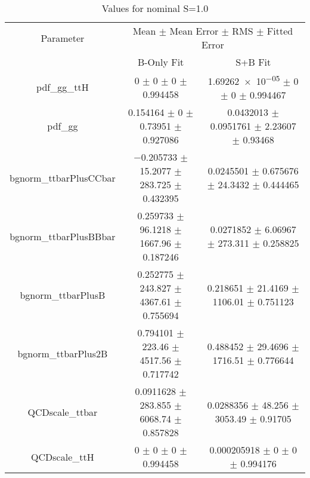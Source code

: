 \begin{table}
\centering
\caption{Values for nominal S=1.0}
\begin{tabular}{ccc}
\toprule
Parameter & \multicolumn{2}{c}{Mean $\pm$ Mean Error $\pm$ RMS $\pm$ Fitted Error}\\
 & B-Only Fit & S+B Fit\\
\midrule
pdf\_gg\_ttH & \num{0} $\pm$ \num{0} $\pm$ \num{0} $\pm$ \num{0.994458} & \num{1.69262e-05} $\pm$ \num{0} $\pm$ \num{0} $\pm$ \num{0.994467}\\
pdf\_gg & \num{0.154164} $\pm$ \num{0} $\pm$ \num{0.73951} $\pm$ \num{0.927086} & \num{0.0432013} $\pm$ \num{0.0951761} $\pm$ \num{2.23607} $\pm$ \num{0.93468}\\
bgnorm\_ttbarPlusCCbar & \num{-0.205733} $\pm$ \num{15.2077} $\pm$ \num{283.725} $\pm$ \num{0.432395} & \num{0.0245501} $\pm$ \num{0.675676} $\pm$ \num{24.3432} $\pm$ \num{0.444465}\\
bgnorm\_ttbarPlusBBbar & \num{0.259733} $\pm$ \num{96.1218} $\pm$ \num{1667.96} $\pm$ \num{0.187246} & \num{0.0271852} $\pm$ \num{6.06967} $\pm$ \num{273.311} $\pm$ \num{0.258825}\\
bgnorm\_ttbarPlusB & \num{0.252775} $\pm$ \num{243.827} $\pm$ \num{4367.61} $\pm$ \num{0.755694} & \num{0.218651} $\pm$ \num{21.4169} $\pm$ \num{1106.01} $\pm$ \num{0.751123}\\
bgnorm\_ttbarPlus2B & \num{0.794101} $\pm$ \num{223.46} $\pm$ \num{4517.56} $\pm$ \num{0.717742} & \num{0.488452} $\pm$ \num{29.4696} $\pm$ \num{1716.51} $\pm$ \num{0.776644}\\
QCDscale\_ttbar & \num{0.0911628} $\pm$ \num{283.855} $\pm$ \num{6068.74} $\pm$ \num{0.857828} & \num{0.0288356} $\pm$ \num{48.256} $\pm$ \num{3053.49} $\pm$ \num{0.91705}\\
QCDscale\_ttH & \num{0} $\pm$ \num{0} $\pm$ \num{0} $\pm$ \num{0.994458} & \num{0.000205918} $\pm$ \num{0} $\pm$ \num{0} $\pm$ \num{0.994176}\\
\bottomrule
\end{tabular}
\end{table}